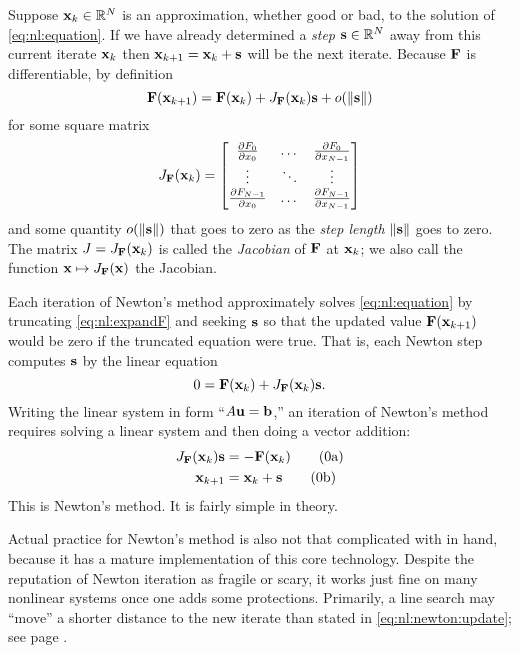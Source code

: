 Suppose $\mathbf{x}_k\in\mathbb{R}^N$ is an approximation, whether good or bad, to the solution of \eqref{eq:nl:equation}.  If we have already determined a \emph{step} $\mathbf{s}\in\mathbb{R}^N$ away from this current iterate $\mathbf{x}_k$ then $\mathbf{x}_{k+1} = \mathbf{x}_k + \mathbf{s}$ will be the next iterate.  Because $\mathbf{F}$ is differentiable, by definition
\begin{equation}
    \mathbf{F}(\mathbf{x}_{k+1}) = \mathbf{F}(\mathbf{x}_k) + J_{\mathbf{F}}(\mathbf{x}_k) \mathbf{s} + o(\|\mathbf{s}\|)  \label{eq:nl:expandF}
\end{equation}
for some square matrix
\begin{equation}
J_{\mathbf{F}}(\mathbf{x}_k) = \begin{bmatrix}
    \frac{\partial F_0}{\partial x_0} & \dots & \frac{\partial F_0}{\partial x_{N-1}} \\
    \vdots & \ddots & \vdots \\
    \frac{\partial F_{N-1}}{\partial x_0} & \dots & \frac{\partial F_{N-1}}{\partial x_{N-1}}  \end{bmatrix}  \label{eq:nl:jacdefn}
\end{equation}
and some quantity $o(\|\mathbf{s}\|)$ that goes to zero as the \emph{step length} $\|\mathbf{s}\|$ goes to zero.  The matrix $J = J_{\mathbf{F}}(\mathbf{x}_k)$ is called the \emph{Jacobian} of $\mathbf{F}$ at $\mathbf{x}_k$; we also call the function $\mathbf{x} \mapsto J_{\mathbf{F}}(\mathbf{x})$ the Jacobian.

Each iteration of Newton's method approximately solves \eqref{eq:nl:equation} by truncating \eqref{eq:nl:expandF} and seeking $\mathbf{s}$ so that the updated value $\mathbf{F}(\mathbf{x}_{k+1})$ would be zero if the truncated equation were true.  That is, each Newton step computes $\mathbf{s}$ by the linear equation
\begin{equation}
    0 = \mathbf{F}(\mathbf{x}_k) + J_{\mathbf{F}}(\mathbf{x}_k) \mathbf{s}.
\end{equation}
Writing the linear system in form ``$A\mathbf{u}=\mathbf{b}$,'' an iteration of Newton's method requires solving a linear system and then doing a vector addition:
\label{eq:nl:newton}  %
\begin{align}
    J_{\mathbf{F}}(\mathbf{x}_k) \mathbf{s} &= - \mathbf{F}(\mathbf{x}_k)  \label{eq:nl:newton:eq} \tag{\theequation a} \\
    \mathbf{x}_{k+1} &= \mathbf{x}_k + \mathbf{s}  \label{eq:nl:newton:update} \tag{\theequation b}
\end{align}
This is Newton's method.  It is fairly simple in theory.

Actual practice for Newton's method is also not that complicated with \PETSc in hand, because it has a mature implementation of this core technology.  Despite the reputation of Newton iteration as fragile or scary, it works just fine on many nonlinear systems once one adds some protections.  Primarily, a line search may ``move'' a shorter distance to the new iterate than stated in \eqref{eq:nl:newton:update}; see page \pageref{sec:linesearch}.

